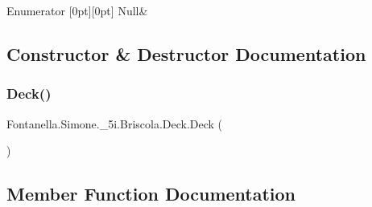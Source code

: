\begin{DoxyEnumFields}{Enumerator}
[0pt][0pt]{}\hypertarget{class_fontanella_1_1_simone_1_1__5i_1_1_briscola_1_1_deck_a7f82994e5bc71f3c6ab33157e02554eaabbb93ef26e3c101ff11cdd21cab08a94}{}\label{class_fontanella_1_1_simone_1_1__5i_1_1_briscola_1_1_deck_a7f82994e5bc71f3c6ab33157e02554eaabbb93ef26e3c101ff11cdd21cab08a94} 
Null&\\
\hline

\end{DoxyEnumFields}


\subsection{Constructor \& Destructor Documentation}
\hypertarget{class_fontanella_1_1_simone_1_1__5i_1_1_briscola_1_1_deck_a4f65193e53a0190f38af395d126709d4}{}\label{class_fontanella_1_1_simone_1_1__5i_1_1_briscola_1_1_deck_a4f65193e53a0190f38af395d126709d4} 
\subsubsection{\texorpdfstring{Deck()}{Deck()}}
{\footnotesize\ttfamily Fontanella.\+Simone.\+\_\+5i.\+Briscola.\+Deck.\+Deck (\begin{DoxyParamCaption}{ }\end{DoxyParamCaption})}



\subsection{Member Function Documentation}
\hypertarget{class_fontanella_1_1_simone_1_1__5i_1_1_briscola_1_1_deck_a12d623abbe81c4a10a6e52a82a426591}{}\label{class_fontanella_1_1_simone_1_1__5i_1_1_briscola_1_1_deck_a12d623abbe81c4a10a6e52a82a426591} 
